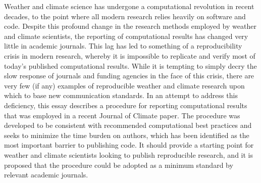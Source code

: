 Weather and climate science has undergone a computational revolution in recent decades, to the point where all modern research relies heavily on software and code. Despite this profound change in the research methods employed by weather and climate scientists, the reporting of computational results has changed very little in academic journals. This lag has led to something of a reproducibility crisis in modern research, whereby it is impossible to replicate and verify most of today's published computational results. While it is tempting to simply decry the slow response of journals and funding agencies in the face of this crisis, there are very few (if any) examples of reproducible weather and climate research upon which to base new communication standards. In an attempt to address this deficiency, this essay describes a procedure for reporting computational results that was employed in a recent Journal of Climate paper. The procedure was developed to be consistent with recommended computational best practices and seeks to minimize the time burden on authors, which has been identified as the most important barrier to publishing code. It should provide a starting point for weather and climate scientists looking to publish reproducible research, and it is proposed that the procedure could be adopted as a minimum standard by relevant academic journals.

  